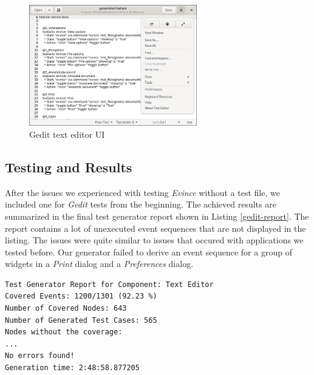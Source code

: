 \begin{figure}[H]
	\centering
	\includegraphics[width=0.65\textwidth]{obrazky-figures/gedit.png}
	\caption{Gedit text editor UI}
	\label{gedit-ui}
\end{figure}

\subsection*{Testing and Results}
After the issues we experienced with testing \textit{Evince} without a test file, we included one for \textit{Gedit} tests from the beginning. The achieved results are summarized in the final test generator report shown in Listing \ref{gedit-report}. The report contains a lot of unexecuted event sequences that are not displayed in the listing. The issues were quite similar to issues that occured with applications we tested before. Our generator failed to derive an event sequence for a group of widgets in a \textit{Print} dialog and a \textit{Preferences} dialog.

\begin{minipage}\linewidth
\begin{lstlisting}[caption={Final test generator report for Gedit},label={gedit-report}]
Test Generator Report for Component: Text Editor
Covered Events: 1200/1301 (92.23 %)
Number of Covered Nodes: 643
Number of Generated Test Cases: 565
Nodes without the coverage:
...
No errors found!
Generation time: 2:48:58.877205
\end{lstlisting}
\end{minipage}

